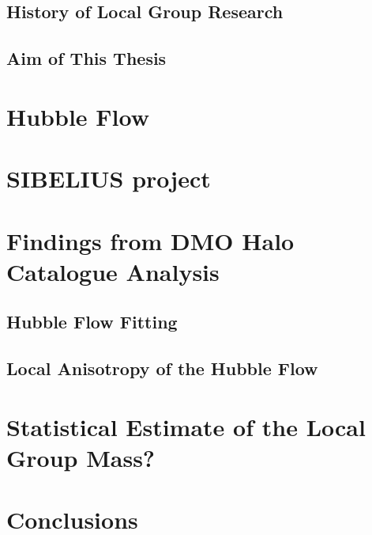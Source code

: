 \documentclass[english, oneside]{HYgradu}
\begin{document}
\section{History of Local Group Research}
\section{Aim of This Thesis}

\chapter{Hubble Flow}

\chapter{SIBELIUS project}

\chapter{Findings from DMO Halo Catalogue Analysis}

\section{Hubble Flow Fitting}

\section{Local Anisotropy of the Hubble Flow}

\chapter{Statistical Estimate of the Local Group Mass?} %

\chapter{Conclusions}


%
%
\end{document}
